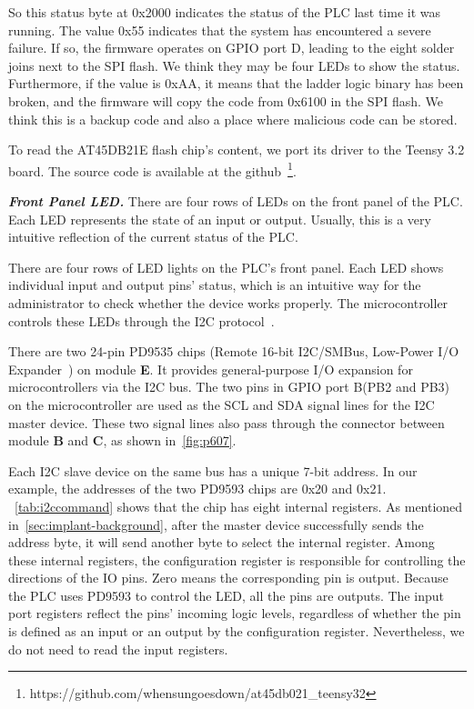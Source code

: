 So this status byte at 0x2000 indicates the status of the PLC last time it was running. The value 0x55 indicates that the system has encountered a severe failure. If so, the firmware operates on GPIO port D, leading to the eight solder joins next to the SPI flash. We think they may be four LEDs to show the status. Furthermore, if the value is 0xAA, it means that the ladder logic binary has been broken, and the firmware will copy the code from 0x6100 in the SPI flash. We think this is a backup code and also a place where malicious code can be stored.

To read the AT45DB21E flash chip's content, we port its driver to the Teensy 3.2 board. The source code is available at the github~\footnote{https://github.com/whensungoesdown/at45db021\_teensy32}.



\textbf{\textit{Front Panel LED.}} There are four rows of LEDs on the front panel of the PLC. Each LED represents the state of an input or output. Usually, this is a very intuitive reflection of the current status of the PLC.

There are four rows of LED lights on the PLC's front panel. Each LED shows individual input and output pins' status, which is an intuitive way for the administrator to check whether the device works properly. The microcontroller controls these LEDs through the I2C protocol~\cite{semiconductors2000i2c}.

There are two 24-pin PD9535 chips (Remote 16-bit I2C/SMBus, Low-Power I/O Expander~\cite{pd9535}) on module \textbf{E}. It provides general-purpose I/O expansion for microcontrollers via the I2C bus. The two pins in GPIO port B(PB2 and PB3) on the microcontroller are used as the SCL and SDA signal lines for the I2C master device. These two signal lines also pass through the connector between module \textbf{B} and \textbf{C}, as shown in~\autoref{fig:p607}.

Each I2C slave device on the same bus has a unique 7-bit address. In our example, the addresses of the two PD9593 chips are 0x20 and 0x21. ~\autoref{tab:i2ccommand} shows that the chip has eight internal registers. As mentioned in~\autoref{sec:implant-background}, after the master device successfully sends the address byte, it will send another byte to select the internal register. Among these internal registers, the configuration register is responsible for controlling the directions of the IO pins. Zero means the corresponding pin is output. Because the PLC uses PD9593 to control the LED, all the pins are outputs. The input port registers reflect the pins' incoming logic levels, regardless of whether the pin is defined as an input or an output by the configuration register. Nevertheless, we do not need to read the input registers.



